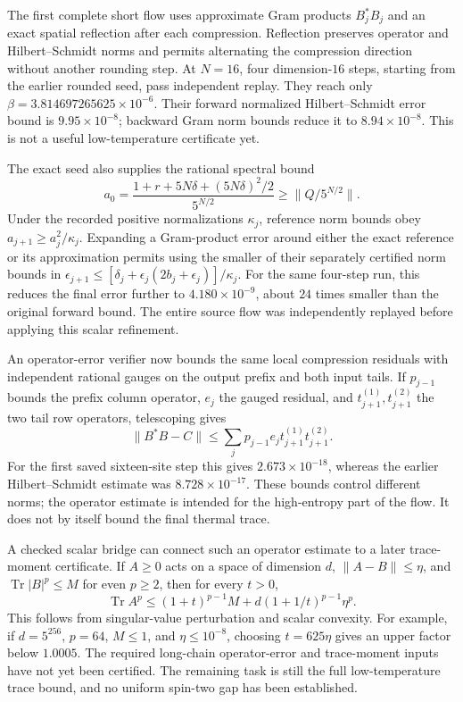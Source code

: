 \documentclass[11pt]{article}
\newcommand{\Tr}{\operatorname{Tr}}
\begin{document}
The first complete short flow uses approximate Gram products
$B_j^*B_j$ and an exact spatial reflection after each compression.
Reflection preserves operator and Hilbert--Schmidt norms and permits
alternating the compression direction without another rounding step.
At $N=16$, four dimension-$16$ steps, starting from the earlier rounded
seed, pass independent replay. They reach only
$\beta=3.814697265625\times10^{-6}$. Their forward normalized
Hilbert--Schmidt error bound is $9.95\times10^{-8}$; backward Gram norm
bounds reduce it to $8.94\times10^{-8}$. This is not a useful
low-temperature certificate yet.

The exact seed also supplies the rational spectral bound
\[
 a_0=\frac{1+r+5N\delta+(5N\delta)^2/2}{5^{N/2}}
 \ge\|Q/5^{N/2}\|.
\]
Under the recorded positive normalizations $\kappa_j$, reference
norm bounds obey $a_{j+1}\ge a_j^2/\kappa_j$. Expanding a Gram-product
error around either the exact reference or its approximation permits
using the smaller of their separately certified norm bounds in
$\epsilon_{j+1}\le[\delta_j+\epsilon_j(2b_j+\epsilon_j)]/\kappa_j$.
For the same four-step run, this reduces the final error further to
$4.180\times10^{-9}$, about $24$ times smaller than the original
forward bound. The entire source flow was independently replayed
before applying this scalar refinement.

An operator-error verifier now bounds the same local compression
residuals with independent rational gauges on the output prefix and
both input tails. If $p_{j-1}$ bounds the prefix column operator,
$e_j$ the gauged residual, and $t^{(1)}_{j+1},t^{(2)}_{j+1}$ the two
tail row operators, telescoping gives
\[
 \|B^*B-C\|\le
 \sum_j p_{j-1}e_jt^{(1)}_{j+1}t^{(2)}_{j+1}.
\]
For the first saved sixteen-site step this gives
$2.673\times10^{-18}$, whereas the earlier Hilbert--Schmidt estimate
was $8.728\times10^{-17}$. These bounds control different norms;
the operator estimate is intended for the high-entropy part of the
flow. It does not by itself bound the final thermal trace.

A checked scalar bridge can connect such an operator estimate to a
later trace-moment certificate. If $A\ge0$ acts on a space of dimension
$d$, $\|A-B\|\le\eta$, and $\Tr|B|^p\le M$ for even $p\ge2$, then
for every $t>0$,
\[
 \Tr A^p\le(1+t)^{p-1}M
       +d(1+1/t)^{p-1}\eta^p.
\]
This follows from singular-value perturbation and scalar convexity.
For example, if $d=5^{256}$, $p=64$, $M\le1$, and
$\eta\le10^{-8}$, choosing $t=625\eta$ gives an upper factor below
$1.0005$. The required long-chain operator-error and trace-moment
inputs have not yet been certified. The remaining task is still the
full low-temperature trace bound, and no uniform spin-two gap has
been established.
\end{document}
